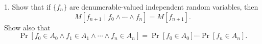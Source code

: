 1. Show that if $\{f_n\}$ are denumerable-valued independent random variables, then
$$M[f_{n+1} \mid f_0 \wedge \cdots \wedge f_n] = M[f_{n+1}].$$
Show also that
$$\Pr[f_0 \in A_0 \wedge f_1 \in A_1 \wedge \cdots \wedge f_n \in A_n] = \Pr[f_0 \in A_0] \cdots \Pr[f_n \in A_n].$$